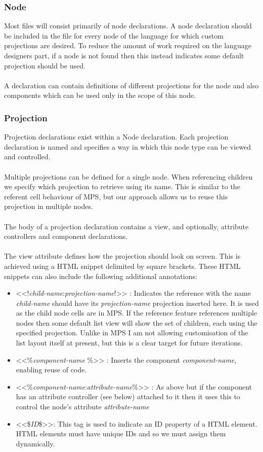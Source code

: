 \documentclass{article}
\begin{document}
{\subsubsection{Node}

Most files will consist primarily of node declarations. A node declaration should be included in the file for every node of the language for which custom projections are desired. To reduce the amount of work required on the language designers part, if a node is not found then this instead indicates some default projection should be used.  
\\
\\
A declaration can contain definitions of different projections for the node and also components which can be used only in the scope of this node.

\subsubsection{Projection}
Projection declarations exist within a Node declaration. Each projection declaration is named and specifies a way in which this node type can be viewed and controlled.
\\
\\
Multiple projections can be defined for a single node. When referencing children we specify which projection to retrieve using its name. This is similar to the referent cell behaviour of MPS, but our approach allows us to reuse this projection in multiple nodes.
\\
\\
The body of a projection declaration contains a view, and optionally, attribute controllers and component declarations.
\\
\\
The view attribute defines how the projection should look on screen. This is achieved using a HTML snippet delimited by square brackets. These HTML snippets can also include the following additional annotations:
\begin{itemize}
\item <<!\emph{child-name}:\emph{projection-name}!>> : Indicates the reference with the name \emph{child-name} should have its \emph{projection-name} projection inserted here. It is used as the child node cells are in MPS. If the reference feature references multiple nodes then some default list view will show the set of children, each using the specified projection. Unlike in MPS I am not allowing customisation of the list layout itself at present, but this is a clear target for future iterations.
\item <<\%\emph{component-name} \%>> : Inserts the component \emph{component-name}, enabling reuse of code.
\item <<\%\emph{component-name}:\emph{attribute-name}\%>> : As above but if the component has an attribute controller (see below) attached to it then it uses this to control the node's attribute \emph{attribute-name}
\item <<\$\emph{ID}\$>>: This tag is used to indicate an ID property of a HTML element. HTML elements must have unique IDs and so we must assign them dynamically.
\end{itemize}

}
\end{document}
